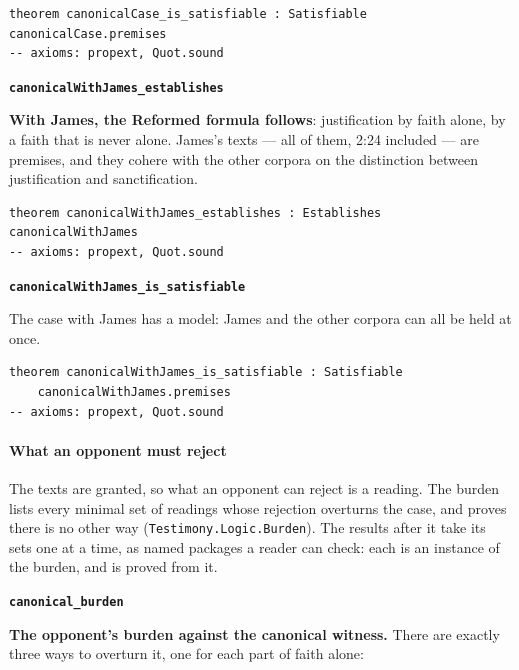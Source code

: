 \documentclass[11pt,paper=\testimonypaper,DIV=13,parskip=false]{scrartcl}
\begin{document}
{\small\begin{verbatim}
theorem canonicalCase_is_satisfiable : Satisfiable canonicalCase.premises
-- axioms: propext, Quot.sound
\end{verbatim}}
\par\medskip\noindent\textbf{\texttt{canonical\allowbreak{}With\allowbreak{}James\_\allowbreak{}establishes}}\par\nobreak\noindent
\textbf{With James, the Reformed formula follows}: justification by faith alone, by a faith that is never alone. James’s texts — all of them, 2:24 included — are premises, and they cohere with the other corpora on the distinction between justification and sanctification.

{\small\begin{verbatim}
theorem canonicalWithJames_establishes : Establishes canonicalWithJames
-- axioms: propext, Quot.sound
\end{verbatim}}
\par\medskip\noindent\textbf{\texttt{canonical\allowbreak{}With\allowbreak{}James\_\allowbreak{}is\_\allowbreak{}satisfiable}}\par\nobreak\noindent
The case with James has a model: James and the other corpora can all be held at once.

{\small\begin{verbatim}
theorem canonicalWithJames_is_satisfiable : Satisfiable
    canonicalWithJames.premises
-- axioms: propext, Quot.sound
\end{verbatim}}
\paragraph*{What an opponent must reject}
\leavevmode\par\nobreak
The texts are granted, so what an opponent can reject is a reading. The burden lists every minimal set of readings whose rejection overturns the case, and proves there is no other way (\texttt{Testimony.Logic.Burden}). The results after it take its sets one at a time, as named packages a reader can check: each is an instance of the burden, and is proved from it.

\par\medskip\noindent\textbf{\texttt{canonical\_\allowbreak{}burden}}\par\nobreak\noindent
\textbf{The opponent’s burden against the canonical witness.} There are exactly three ways to overturn it, one for each part of faith alone:
\end{document}
